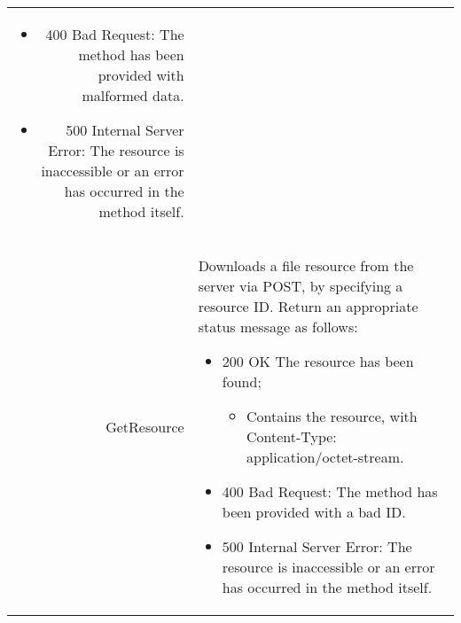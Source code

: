 \begin{longtable}{r p{10cm}}
\begin{itemize}
		\item 400 Bad Request: The method has been provided with malformed data.
		\item 500 Internal Server Error: The resource is inaccessible or an error has occurred in the method itself.
	\end{itemize}\\
	GetResource & Downloads a file resource from the server via POST, by specifying a resource ID. Return an appropriate status message as follows:
	\begin{itemize}
		\item 200 OK The resource has been found; 
		\begin{itemize}
			\item Contains the resource, with Content-Type: application/octet-stream.
		\end{itemize}
		\item 400 Bad Request: The method has been provided with a bad ID.
		\item 500 Internal Server Error: The resource is inaccessible or an error has occurred in the method itself.
	\end{itemize}\\
\end{longtable}